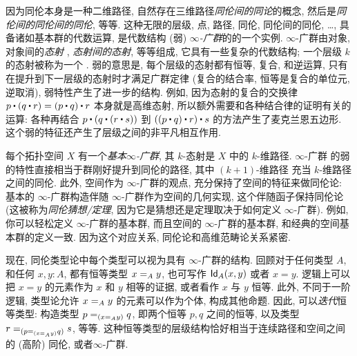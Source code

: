 因为同伦本身是一种二维路径, 自然存在三维路径\emph{同伦间的同论}的概念,
%
然后是\emph{同伦间的同伦间的同伦}, 等等.
这种无限的层级, 点, 路径, 同伦, 同伦间的同伦, \ldots, 具备诸如基本群的代数运算, 是代数结构 (弱) \emph{$\infty$-广群}的的一个实例.
$\infty$-广群由对象, 对象间的\emph{态射}%
, \emph{态射间的态射}, 等等组成, 它具有一些复杂的代数结构;
一个层级 $k$ 的态射被称为一个 .
弱的意思是, 每个层级的态射都有恒等, 复合, 和逆运算, 只有在提升到下一层级的态射时才满足广群定律 (复合的结合率, 恒等是复合的单位元, 逆取消), 弱特性产生了进一步的结构.
例如, 因为态射的复合的交换律 $p \ct (q \ct r) = (p \ct q) \ct r$ 本身就是高维态射, 所以额外需要和各种结合律的证明有关的运算: 各种再结合 $p \ct (q \ct (r \ct s))$ 到 $((p \ct q) \ct r) \ct s$ 的方法产生了麦克兰恩五边形.
这个弱的特征还产生了层级之间的非平凡相互作用.

每个拓扑空间 $X$ 有一个\emph{基本$\infty$-广群},
%
%
其 $k$-态射是 $X$ 中的 $k$-维路径.
$\infty$-广群 的弱的特性直接相当于群刚好提升到同伦的路径, 其中 $(k+1)$-维路径 充当 $k$-维路径之间的同伦.
此外, 空间作为 $\infty$-广群的观点, 充分保持了空间的特征来做同伦论: 基本的 $\infty$-广群构造伴随 $\infty$-广群作为空间的几何实现, 这个伴随函子保持同伦论
(这被称为\emph{同伦猜想/定理}, 
%
因为它是猜想还是定理取决于如何定义 $\infty$-广群).
例如, 你可以轻松定义 $\infty$-广群的基本群, 而且空间的 $\infty$-广群的基本群, 和经典的空间基本群的定义一致.
因为这个对应关系, 同伦论和高维范畴论关系紧密.

%
%

\mentalpause

现在, 同伦类型论中每个类型可以视为具有 $\infty$-广群的结构.
回顾对于任何类型 $A$, 和任何 $x,y:A$, 都有恒等类型 $\id[A]{x}{y}$, 也可写作 $\idtype[A]{x}{y}$ 或者 $x=y$.
逻辑上可以把 $x=y$ 的元素作为 $x$ 和 $y$ 相等的证据, 或者看作 $x$ 与 $y$ 恒等. 此外, 不同于一阶逻辑, 类型论允许 $\id[A]{x}{y}$ 的元素可以作为个体, 构成其他命题.
因此, 可以\emph{迭代}恒等类型: 构造类型
$\id[{(\id[A]{x}{y})}]{p}{q}$, 即两个恒等 $p,q$ 之间的恒等, 以及类型 $\id[{(\id[{(\id[A]{x}{y})}]{p}{q})}]{r}{s}$, 等等.
这种恒等类型的层级结构恰好相当于连续路径和空间之间的 (高阶) 同伦, 或者$\infty$-广群.


